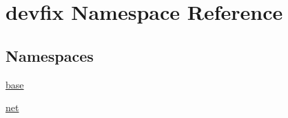 \hypertarget{namespacedevfix}{}\section{devfix Namespace Reference}
\label{namespacedevfix}
\subsection*{Namespaces}
\begin{DoxyCompactItemize}
\item 
 \hyperlink{namespacedevfix_1_1base}{base}
\item 
 \hyperlink{namespacedevfix_1_1net}{net}
\end{DoxyCompactItemize}

